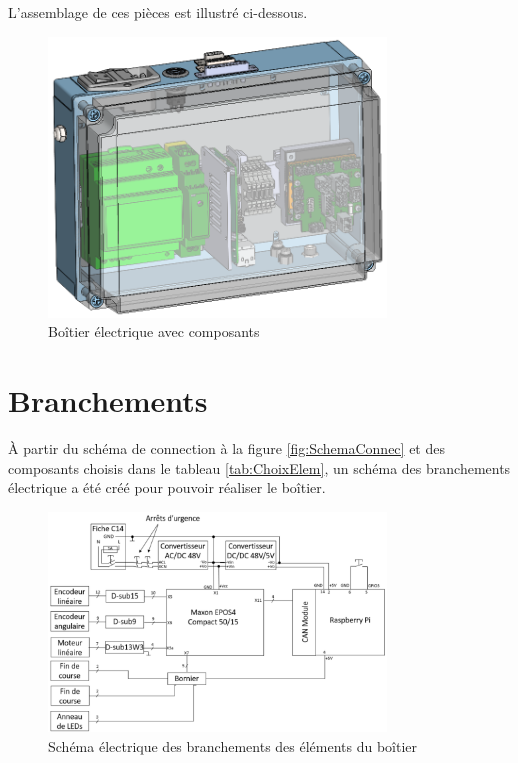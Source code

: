 L'assemblage de ces pièces est illustré ci-dessous.

\begin{figure}[H]
    \centering
    \includegraphics[width = 0.8\textwidth]{assets/figures/AssemblageBoitierElectrique.png}
    \caption{Boîtier électrique avec composants}
    \label{fig:AssBoitierElec}
\end{figure}

\section{Branchements}\label{sec:Branche}

À partir du schéma de connection à la figure \ref{fig:SchemaConnec} et des composants choisis dans le tableau \ref{tab:ChoixElem}, un schéma
des branchements électrique a été créé pour pouvoir réaliser le boîtier.

\begin{figure}[H]
    \centering
    \includegraphics[width = 0.8\textwidth]{assets/figures/SchemaElectrique.svg}
    \caption{Schéma électrique des branchements des éléments du boîtier}
    \label{fig:SchemaElec}
\end{figure}

